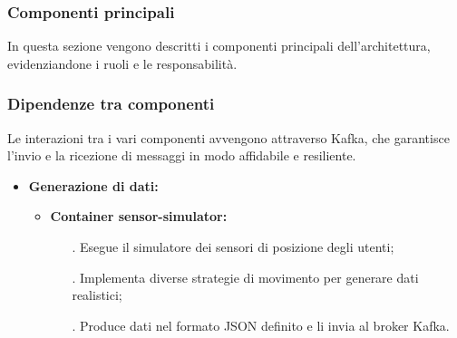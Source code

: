 \documentclass[10pt]{article}
\begin{document}
        \subsubsection{Componenti principali}
        In questa sezione vengono descritti i componenti principali dell'architettura, evidenziandone i ruoli e le responsabilità.

        \subsubsection{Dipendenze tra componenti}
        Le interazioni tra i vari componenti avvengono attraverso Kafka, che garantisce l'invio e la ricezione di messaggi in modo affidabile e resiliente.

\begin{itemize}
    \item \textbf{Generazione di dati:}
    \begin{itemize}
        \item \textbf{Container sensor-simulator:}
        \begin{itemize}
            \item[.] Esegue il simulatore dei sensori di posizione degli utenti;
            \item[.] Implementa diverse strategie di movimento per generare dati realistici;
            \item[.] Produce dati nel formato JSON definito e li invia al broker Kafka.
        \end{itemize}
    \end{itemize}


\end{itemize}
\end{document}

